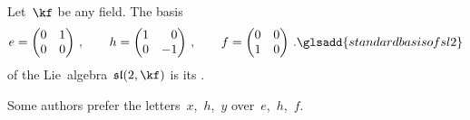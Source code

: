 \begin{definition}
 Let~$\kf$ be any field.
 The basis
 \[
		e
		=
		\begin{pmatrix}
			0 & 1 \\
			0 & 0
		\end{pmatrix} \,,
		\qquad
		h
		=
		\begin{pmatrix*}[r]
			1 &  0  \\
			0 & -1
		\end{pmatrix*}  \,,
		\qquad
		f
		=
		\begin{pmatrix}
			0 & 0 \\
			1 & 0
		\end{pmatrix} \,.
		\glsadd{standard basis of sl2}
	\]
	of the Lie~algebra~$\sllie(2, \kf)$ is its .
\end{definition}


\begin{remark}
	Some authors prefer the letters~$x$,~$h$,~$y$ over~$e$,~$h$,~$f$.
\end{remark}


